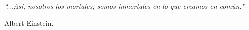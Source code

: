 \documentclass[letterpaper,11pt]{report}
\begin{document}
\emph{\textquotedblleft ...As\'i, nosotros los mortales, somos
inmortales en lo que creamos en com\'un."}

\begin{flushright}
Albert Einstein.
\end{flushright}

\newpage

\tableofcontents
{}
\setcounter{page}{1}


\newpage

\newpage

\newpage

\newpage

\newpage

\newpage
\appendix
%

\newpage

\newpage

\end{document}
